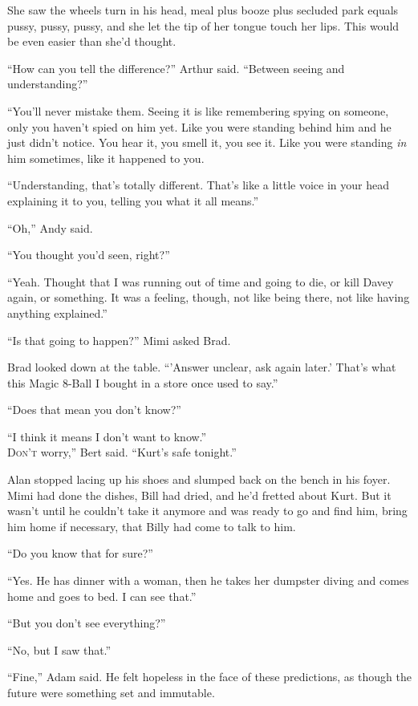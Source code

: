She saw the wheels turn in his head, meal plus booze plus secluded
park equals pussy, pussy, pussy, and she let the tip of her tongue
touch her lips.  This would be even easier than she'd thought.

``How can you tell the difference?'' Arthur said.  ``Between seeing
and understanding?''

``You'll never mistake them.  Seeing it is like remembering spying on
someone, only you haven't spied on him yet.  Like you were standing
behind him and he just didn't notice.  You hear it, you smell it, you
see it.  Like you were standing \textit{in} him sometimes, like it
happened to you.

``Understanding, that's totally different.  That's like a little voice
in your head explaining it to you, telling you what it all means.''

``Oh,'' Andy said.

``You thought you'd seen, right?''

``Yeah.  Thought that I was running out of time and going to die, or
kill Davey again, or something.  It was a feeling, though, not like
being there, not like having anything explained.''

``Is that going to happen?'' Mimi asked Brad.

Brad looked down at the table.  ``'Answer unclear, ask again later.'
That's what this Magic 8-Ball I bought in a store once used to say.''

``Does that mean you don't know?''

``I think it means I don't want to know.''
\\
\lettrine[lines=3, lhang=.5, nindent=0pt, findent=2pt]{D}{on't}
worry,'' Bert said.  ``Kurt's safe tonight.''

Alan stopped lacing up his shoes and slumped back on the bench in his
foyer.  Mimi had done the dishes, Bill had dried, and he'd fretted
about Kurt.  But it wasn't until he couldn't take it anymore and was
ready to go and find him, bring him home if necessary, that Billy had
come to talk to him.

``Do you know that for sure?''

``Yes.  He has dinner with a woman, then he takes her dumpster diving
and comes home and goes to bed.  I can see that.''

``But you don't see everything?''

``No, but I saw that.''

``Fine,'' Adam said.  He felt hopeless in the face of these
predictions, as though the future were something set and immutable.

